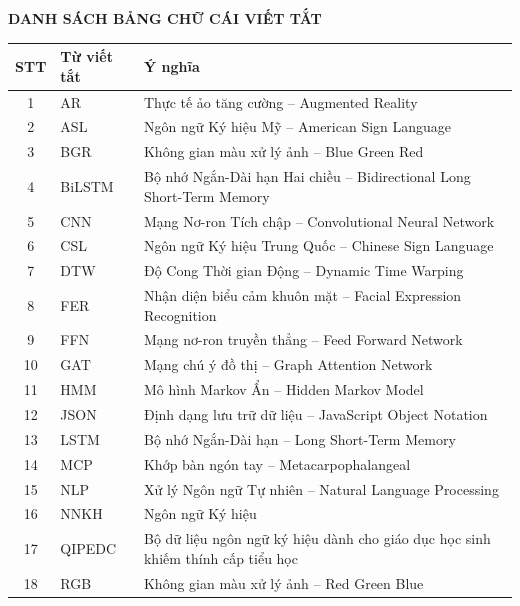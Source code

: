 \begin{center}
    {\fontsize{14}{17}\selectfont\bfseries DANH SÁCH BẢNG CHỮ CÁI VIẾT TẮT}
\end{center}
\begin{table}[h]
\centering
\begin{tabular}{|c|l|p{10cm}|}
\hline
\textbf{STT} & \textbf{Từ viết tắt} & \textbf{Ý nghĩa} \\
\hline
1  & AR      & Thực tế ảo tăng cường -- Augmented Reality \\
\hline
2  & ASL     & Ngôn ngữ Ký hiệu Mỹ -- American Sign Language \\
\hline
3  & BGR     & Không gian màu xử lý ảnh -- Blue Green Red \\
\hline
4  & BiLSTM  & Bộ nhớ Ngắn-Dài hạn Hai chiều -- Bidirectional Long Short-Term Memory \\
\hline
5  & CNN     & Mạng Nơ-ron Tích chập -- Convolutional Neural Network \\
\hline
6  & CSL     & Ngôn ngữ Ký hiệu Trung Quốc -- Chinese Sign Language \\
\hline
7  & DTW     & Độ Cong Thời gian Động -- Dynamic Time Warping \\
\hline
8  & FER     & Nhận diện biểu cảm khuôn mặt -- Facial Expression Recognition \\
\hline
9  & FFN     & Mạng nơ-ron truyền thẳng -- Feed Forward Network \\
\hline
10 & GAT     & Mạng chú ý đồ thị -- Graph Attention Network \\
\hline
11 & HMM     & Mô hình Markov Ẩn -- Hidden Markov Model \\
\hline
12 & JSON    & Định dạng lưu trữ dữ liệu -- JavaScript Object Notation \\
\hline
13 & LSTM    & Bộ nhớ Ngắn-Dài hạn -- Long Short-Term Memory \\
\hline
14 & MCP     & Khớp bàn ngón tay -- Metacarpophalangeal \\
\hline
15 & NLP     & Xử lý Ngôn ngữ Tự nhiên -- Natural Language Processing \\
\hline
16 & NNKH    & Ngôn ngữ Ký hiệu \\
\hline
17 & QIPEDC  & Bộ dữ liệu ngôn ngữ ký hiệu dành cho giáo dục học sinh khiếm thính cấp tiểu học \\
\hline
18 & RGB     & Không gian màu xử lý ảnh -- Red Green Blue \\

\end{tabular}
\end{table}

